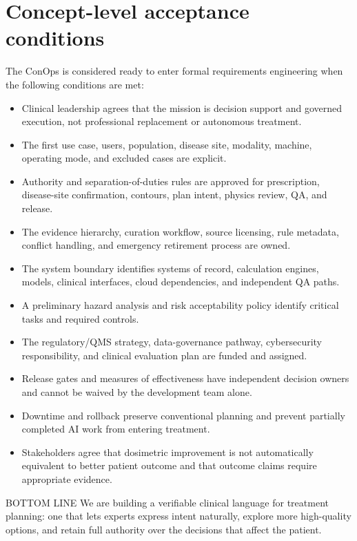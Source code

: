 \documentclass[11pt,letterpaper]{article}
\begin{document}
\section{Concept-level acceptance conditions}

The ConOps is considered ready to enter formal requirements engineering when the following conditions are met:

\begin{itemize}
\item Clinical leadership agrees that the mission is decision support and governed execution, not professional replacement or autonomous treatment.
\item The first use case, users, population, disease site, modality, machine, operating mode, and excluded cases are explicit.
\item Authority and separation-of-duties rules are approved for prescription, disease-site confirmation, contours, plan intent, physics review, QA, and release.
\item The evidence hierarchy, curation workflow, source licensing, rule metadata, conflict handling, and emergency retirement process are owned.
\item The system boundary identifies systems of record, calculation engines, models, clinical interfaces, cloud dependencies, and independent QA paths.
\item A preliminary hazard analysis and risk acceptability policy identify critical tasks and required controls.
\item The regulatory\slash\allowbreak{}QMS strategy, data-governance pathway, cybersecurity responsibility, and clinical evaluation plan are funded and assigned.
\item Release gates and measures of effectiveness have independent decision owners and cannot be waived by the development team alone.
\item Downtime and rollback preserve conventional planning and prevent partially completed AI work from entering treatment.
\item Stakeholders agree that dosimetric improvement is not automatically equivalent to better patient outcome and that outcome claims require appropriate evidence.
\end{itemize}

\begin{nlnotice}{BOTTOM LINE}
We are building a verifiable clinical language for treatment planning: one that lets experts express intent naturally, explore more high-quality options, and retain full authority over the decisions that affect the patient.
\end{nlnotice}
\end{document}
